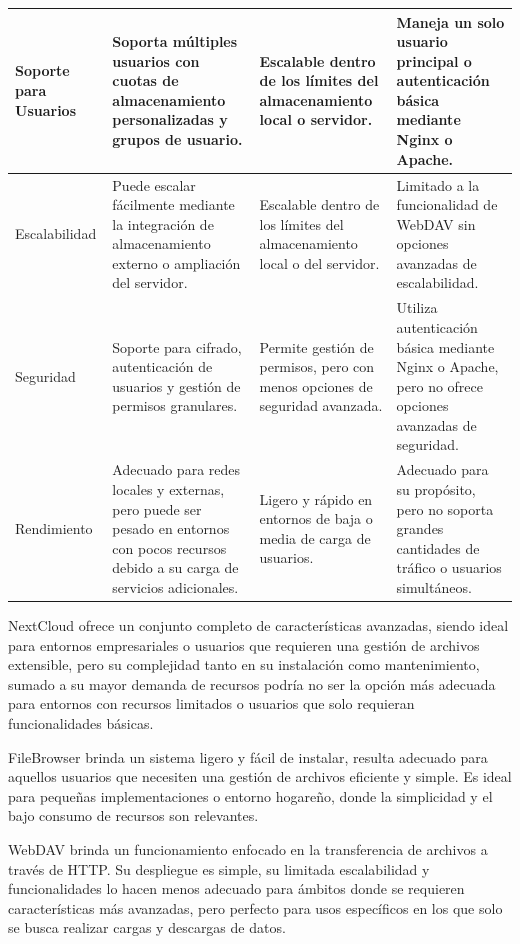 \documentclass[a4paper,10pt]{article}
\begin{document}
\begin{table}[htbp]
\begin{tabularx}{\textwidth}{>{\hsize=0.8\hsize}X >{\hsize=1.1\hsize}X >{\hsize=1.1\hsize}X >{\hsize=1.1\hsize}X}
			\midrule
			Soporte para Usuarios & Soporta múltiples usuarios con cuotas de almacenamiento personalizadas y grupos de usuario. & Escalable dentro de los límites del almacenamiento local o servidor. & Maneja un solo usuario principal o autenticación básica mediante Nginx o Apache. \\
			\midrule
			Escalabilidad & Puede escalar fácilmente mediante la integración de almacenamiento externo o ampliación del servidor. & Escalable dentro de los límites del almacenamiento local o del servidor. & Limitado a la funcionalidad de WebDAV sin opciones avanzadas de escalabilidad. \\
			\midrule
			Seguridad & Soporte para cifrado, autenticación de usuarios y gestión de permisos granulares. & Permite gestión de permisos, pero con menos opciones de seguridad avanzada. & Utiliza autenticación básica mediante Nginx o Apache, pero no ofrece opciones avanzadas de seguridad. \\
			\midrule
			Rendimiento & Adecuado para redes locales y externas, pero puede ser pesado en entornos con pocos recursos debido a su carga de servicios adicionales. & Ligero y rápido en entornos de baja o media de carga de usuarios. & Adecuado para su propósito, pero no soporta grandes cantidades de tráfico o usuarios simultáneos. \\
			\bottomrule
		\end{tabularx}
	\end{table}
	
	NextCloud ofrece un conjunto completo de características avanzadas, siendo ideal para entornos empresariales o usuarios que requieren una gestión de archivos extensible, pero su complejidad tanto en su instalación como mantenimiento, sumado a su mayor demanda de recursos podría no ser la opción más adecuada para entornos con recursos limitados o usuarios que solo requieran funcionalidades básicas.
	
	FileBrowser brinda un sistema ligero y fácil de instalar, resulta adecuado para aquellos usuarios que necesiten una gestión de archivos eficiente y simple. Es ideal para pequeñas implementaciones o entorno hogareño, donde la simplicidad y el bajo consumo de recursos son relevantes.

	WebDAV brinda un funcionamiento enfocado en la transferencia de archivos a través de HTTP. Su despliegue es simple, su limitada escalabilidad y funcionalidades lo hacen menos adecuado para ámbitos donde se requieren características más avanzadas, pero perfecto para usos específicos en los que solo se busca realizar cargas y descargas de datos.
	
\end{document}

